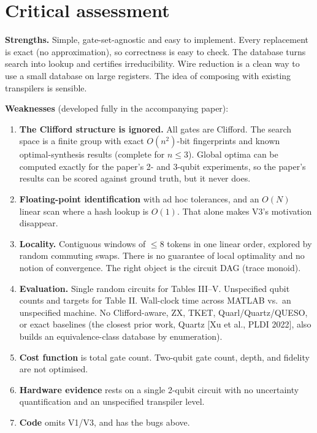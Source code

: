 \documentclass[11pt,a4paper]{article}
\begin{document}
\section{Critical assessment}
\textbf{Strengths.} Simple, gate-set-agnostic and easy to implement. Every replacement is exact (no approximation), so
correctness is easy to check. The database turns search into lookup and certifies irreducibility. Wire reduction is a
clean way to use a small database on large registers. The idea of composing with existing transpilers is sensible.

\textbf{Weaknesses} (developed fully in the accompanying paper):
\begin{enumerate}[nosep]
\item \textbf{The Clifford structure is ignored.} All gates are Clifford. The search space is a finite group with
  exact $O(n^2)$-bit fingerprints and known optimal-synthesis results (complete for $n\le3$). Global optima can be computed exactly
  for the paper's 2- and 3-qubit experiments, so the paper's results can be scored against ground truth, but it never does.
\item \textbf{Floating-point identification} with ad hoc tolerances, and an $O(N)$ linear scan where a hash lookup is $O(1)$. That alone
  makes V3's motivation disappear.
\item \textbf{Locality.} Contiguous windows of $\le 8$ tokens in one linear order, explored by random commuting swaps. There is no
  guarantee of local optimality and no notion of convergence. The right object is the circuit DAG (trace monoid).
\item \textbf{Evaluation.} Single random circuits for Tables III--V. Unspecified qubit counts and targets for Table II. Wall-clock
  time across MATLAB vs.\ an unspecified machine. No Clifford-aware, ZX, TKET, Quarl/Quartz/QUESO, or exact baselines (the closest prior
  work, Quartz [Xu et al., PLDI 2022], also builds an equivalence-class database by enumeration).
\item \textbf{Cost function} is total gate count. Two-qubit gate count, depth, and fidelity are not optimised.
\item \textbf{Hardware evidence} rests on a single 2-qubit circuit with no uncertainty quantification and an unspecified transpiler level.
\item \textbf{Code} omits V1/V3, and has the bugs above.
\end{enumerate}
\end{document}

